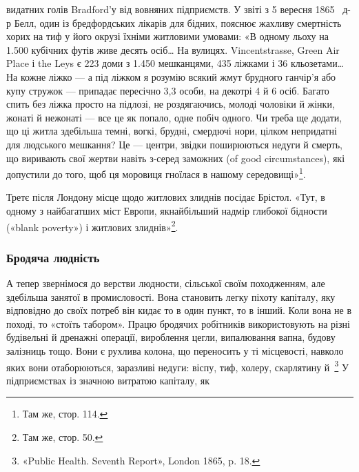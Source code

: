 видатних голів Bradford’у від вовняних підприємств. У звіті
з 5 вересня 1865~ д-р Белл, один із бредфордських лікарів для
бідних, пояснює жахливу смертність хорих на тиф у його окрузі
їхніми житловими умовами: «В одному льоху на \num{1.500} кубічних
футів живе десять осіб\dots{} На вулицях. Vincentstrasse, Green
Air Place і the Leys є 223 доми з \num{1.450} мешканцями, 435 ліжками
і 36 кльозетами\dots{} На кожне ліжко — а під ліжком я розумію
всякий жмут брудного ганчір’я або купу стружок — припадає
пересічно 3,3 особи, на декотрі 4 й 6 осіб. Багато спить без ліжка
просто на підлозі, не роздягаючись, молоді чоловіки й жінки,
жонаті й нежонаті — все це як попало, одне побіч одного. Чи
треба ще додати, що ці житла здебільша темні, вогкі, брудні,
смердючі нори, цілком непридатні для людського мешкання?
Це — центри, звідки поширюються недуги й смерть, що виривають
свої жертви навіть з-серед заможних (of good circumstances),
які допустили до того, щоб ця моровиця гноїлася в нашому
середовищі»\footnote{
Там же, стор. 114.
}.

Третє після Лондону місце щодо житлових злиднів посідає
Брістол. «Тут, в одному з найбагатших міст Европи, якнайбільший
надмір глибокої бідности («blank poverty») і житлових
злиднів»\footnote{
Там же, стор. 50.
}.

\subsubsection{Бродяча людність}

А тепер звернімося до верстви людности, сільської своїм походженням,
але здебільша занятої в промисловості. Вона становить
легку піхоту капіталу, яку відповідно до своїх потреб
він кидає то в один пункт, то в інший. Коли вона не в поході,
то «стоїть табором». Працю бродячих робітників використовують
на різні будівельні й дренажні операції, вироблення цегли,
випалювання вапна, будову залізниць тощо. Вони є рухлива
колона, що переносить у ті місцевості, навколо яких вони отаборюються,
заразливі недуги: віспу, тиф, холеру, скарлятину
й~\footnote{
«Public Health. Seventh Report», London 1865, p. 18.
} У підприємствах із значною витратою капіталу, як
\parbreak{}  %
